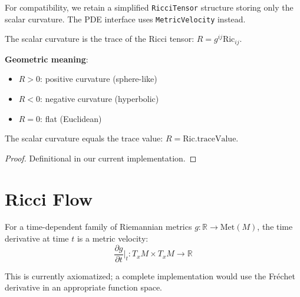 \begin{definition}
\label{def:ricci_tensor}
\leanok
{}
For compatibility, we retain a simplified \texttt{RicciTensor} structure storing only the scalar curvature. The PDE interface uses \texttt{MetricVelocity} instead.
\end{definition}

\begin{definition}
\label{def:scalar_curvature}
\leanok
{}
The scalar curvature is the trace of the Ricci tensor: $R = g^{ij} \mathrm{Ric}_{ij}$.

\textbf{Geometric meaning}:
\begin{itemize}
\item $R > 0$: positive curvature (sphere-like)
\item $R < 0$: negative curvature (hyperbolic)
\item $R = 0$: flat (Euclidean)
\end{itemize}
\end{definition}

\begin{lemma}
\label{lem:scalar_curvature_eq}
\leanok
{}
The scalar curvature equals the trace value: $R = \mathrm{Ric}.\mathrm{traceValue}$.
\end{lemma}

\begin{proof}
\leanok
{}
Definitional in our current implementation.
\end{proof}

\chapter{Ricci Flow}
\label{chap:flow}

\begin{definition}
\label{def:time_deriv}
For a time-dependent family of Riemannian metrics $g : \mathbb{R} \to \mathrm{Met}(M)$, the time derivative at time $t$ is a metric velocity:
\[ \frac{\partial g}{\partial t}\Big|_t : T_xM \times T_xM \to \mathbb{R} \]

This is currently axiomatized; a complete implementation would use the Fr\'echet derivative in an appropriate function space.
\end{definition}

